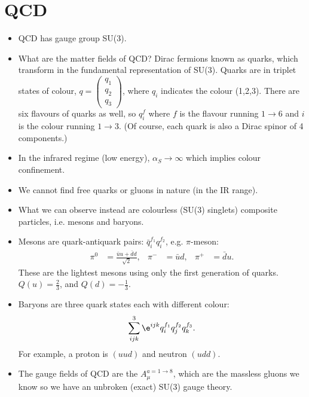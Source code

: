 \documentclass[relqm.tex]{subfiles}
\begin{document}
\section{QCD}
\begin{itemize}
    \item QCD has gauge group SU(3).
    \item What are the matter fields of QCD? Dirac fermions known as quarks, which transform in the fundamental representation of SU(3). 
        Quarks are in triplet states of colour, $q=\begin{pmatrix}q_1\\q_2\\q_3\end{pmatrix}$, where $q_i$ indicates the colour (1,2,3). 
        There are six flavours of quarks as well, so $q^f_i$ where $f$ is the flavour running $1\to6$ and $i$ is the colour running $1\to3$. 
        (Of course, each quark is also a Dirac spinor of 4 components.)
    \item In the infrared regime (low energy), $\alpha_S\to\infty$ which implies colour confinement.
    \item We cannot find free quarks or gluons in nature (in the IR range).
    \item What we can observe instead are colourless (SU(3) singlets) composite particles, i.e. mesons and baryons. 
    \item Mesons are quark-antiquark pairs: $\bar{q}_i^{f_1}q_i^{f_2}$, e.g. $\pi$-meson:
        \begin{align}
            \pi^0 &= \frac{\bar{u}u + \bar{d}d}{\sqrt{2}}, &
            \pi^- &= \bar{u}d, &
            \pi^+ &= \bar{d}u.
        \end{align}
        These are the lightest mesons using only the first generation of quarks. 
        $Q(u) = \frac23$, and $Q(d)=-\frac13$.
    \item Baryons are three quark states each with different colour:
        \begin{align}
            \sum_{ijk}^3 \e^{ijk}q^{f_1}_iq^{f_2}_jq^{f_3}_k.
        \end{align}
        For example, a proton is $(uud)$ and neutron $(udd)$.
    \item The gauge fields of QCD are the $A_\mu^{a=1\to8}$, which are the massless gluons we know so we have an unbroken (exact) SU(3) gauge theory.
\end{itemize}
\end{document}
